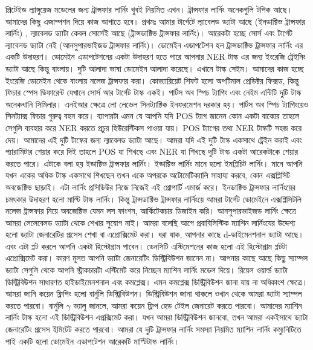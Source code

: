 \documentclass{book}
\begin{document}
প্রিটেইন্ড ল্যাঙ্গুয়েজ মডেলের জন্য ট্রান্সফার লার্নিং খুবই নিয়মিত এখন। ট্রান্সফার লার্নিং অনেকগুলি টপিক আছে। আমাদের কিছু এজাম্পশন দিয়ে কাজ আগাতে হবে। প্রথমঃ আমার টার্গেটে ল্যাবেলড ড্যাটা আছে (ইনডাক্টিভ ট্রান্সফার লার্নিং) , ল্যাবেলড ড্যাটা কেবল সোর্সেই আছে (ট্রান্সডাক্টিভ ট্রান্সফার লার্নিং)। আরেকটা হচ্ছে সোর্স এবং টার্গেট ল্যাবেলড ড্যাটা নেই (আনসুপারভাইজড ট্রান্সফার লার্নিং)। ডোমেইন এডাপটেশন হল ট্রান্সডাক্টিভ ট্রান্সফার লার্নিং এর একটি উদাহরণ। ডোমেইন এডাপটেশনের একটা উদাহরণ হতে পারে আপনার NER টাস্ক এর জন্য ইংরেজি ট্রেইনিং ড্যাটা আছে কিন্তু বাংলায়। দুটি আলাদা ভাষা ডোমেইন আলাদা করেছে। এখানে টাস্ক সেইম। আমাদের কাজ হচ্ছে ইংরেজি ডোমেইন থেকে বাংলায় নলেজ ট্রান্সফার করা।  কোভ্যারিয়েট শিফট হলো অপটিমাল প্রেডিক্টর ফিক্সড, কিন্তু ফিচার স্পেস ডিফারেন্ট যেখানে সোর্স আর টার্গেট টাস্ক একই। পার্টস অব স্পিচ ট্যাগিং এবং নেইম এন্টিটি দুটি টাস্ক অনেকখানি সিমিলার। এনইআর ক্ষেত্রে লো লেভেল সিনট্যাক্টিক ইনফরমেশন দরকার হয়। পার্টস অব স্পিচ ট্যাগিংয়েও সিনট্যাক্স ফিচার গুরুত্ব বহন করে। ব্যাপারটা এমন যে আপনি যদি POS ট্যাগ জানেন কোন একটা বাক্যের তাহলে সেগুলি ব্যবহার করে NER করতে প্রচুর হিউরেস্টিকস পাওয়া যায়। POS ট্যাগের তথ্য NER টাস্কটি সহজ করে দেয়। আমাদের এই দুটি টাস্কের জন্য ল্যাবেলড ড্যাটা আছে। আমরা যদি এই দুটি টাস্ক একসাথে ট্রেইন করাই এবং প্যারামিটার শেয়ার করে দিই তাহলে POS যা শিখছে এবং NER যা শিখছে দুটি টাস্ক একটা আরেকটাকে শেয়ার করতে পারে। এটাকে বলা হয় ইন্ডাক্টিভ ট্রান্সফার লার্নিং। ইন্ডাক্টিভ লার্নিং মানে হলো ইমপ্লিচিট লার্নিং। মানে আপনি যখন একের অধিক টাস্ক একসাথে শিখছেন  তখন একে অপরকে অটোমেটিক্যালি সাহায্য করবে, কোন এক্সপ্লিসিট অবজেক্টিভ ছাড়াই। এটা লার্নিং প্রসিডিউর নিজে নিজেই এই প্রোপার্টি এমার্জ করে। ইনডাক্টিভ ট্রান্সফার লার্নিংয়ের চমৎকার উদাহরণ হলো মাল্টি টাস্ক লার্নিং। কিন্তু ট্রান্সডাক্টিভ ট্রান্সফার লার্নিংয়ে  আমরা টার্গেট ডোমেইনে এক্সপ্লিসিটলি নলেজ ট্রান্সফার নিয়ে অবজেক্টিভ যেমন লস ফাংশন, আর্কিটেকচার ডিজাইন করি। আনসুপারভাইজড লার্নিং ক্ষেত্রে আমরা লেলেবেলড ড্যাটা থেকে শেখার সুযোগ নাই। আমরা বলেছি আগে প্রবাবিলিস্টিক ম্যাশিন লার্নিংযের উদ্দেশ্য হলো ড্যাটা জেনারেটির প্রসেস শেখা বা এপ্রোক্সিমেট করা। ধরা যাক, আপনার কাছে d-ডাইমেনশনাল ড্যাটা আছে। এবং এটা  প্লট করলে আপনি একটা হিস্টোগ্রাম পাবেন। ডেনসিটি এস্টিমেশনের কাজ হলো এই হিস্টোগ্রাম প্লটটা এপ্রোক্সিমেট করা। কারণ মূলত আপনি ড্যাটা জেনারেটিং ডিস্ট্রিবিউশন জানেন না। আপনার কাছে আছে কিছু স্যাম্পল ড্যাটা সেগুলি থেকে আপনি স্ট্রাকচারটা এস্টিমেট করে নিচ্ছেন ম্যাশিন লার্নিং মডেল দিয়ে। রিয়েল ওয়ার্ল্ড ড্যাটা ডিস্ট্রিবিউশন সাধারণত হাইডাইমেনশনাল এবং কমপ্লেক্স। এমন কমপ্লেক্স ডিস্ট্রিবিউশন জানা যায় না অধিকাংশ ক্ষেত্রে। আমরা জানি কয়েন ফ্লিপিং হলো বার্নুলি ডিস্ট্রিবিউশন। ডিস্ট্রিবিউশন জানা থাকলে ওখান থেকে আমরা ড্যাটা স্যাম্পল করতে পারবো। বার্নুলি $\gamma$ ভ্যালু জানলে, আমরা কয়েন ফ্লিপ হেড টেইল জেনারেট করতে পারবো। আমাদের ম্যাশিন লার্নিং টাস্ক হলো এই ডিস্ট্রিবিউশন এপ্রক্সিমেট করা। যখন আমরা ডিস্ট্রিবিউশন জানবো, তখন আমরা একইসাথে ড্যাটা জেনারেটিং প্রসেস ইমিটেট করতে পারবো। আমরা যে দুটি ট্রান্সফার লার্নিং সমস্যা নিয়মিত ম্যাশিন লার্নিং কম্যুনিটিতে পাই একটি হলো ডোমেইন এডাপটেশন আরেকটি মাল্টিটাস্ক লার্নিং। 
\end{document}
